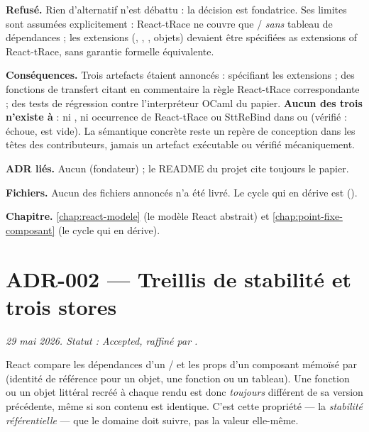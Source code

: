 \textbf{Refusé.} Rien d'alternatif n'est débattu : la décision est fondatrice.
Ses limites sont assumées explicitement : React-tRace ne couvre que
/ \emph{sans} tableau de dépendances ; les
extensions (, , , objets)
devaient être spécifiées \og as extensions of React-tRace\fg{}, sans garantie
formelle équivalente.

\textbf{Conséquences.} Trois artefacts étaient annoncés : 
spécifiant les extensions ; des fonctions de transfert citant en commentaire
la règle React-tRace correspondante ; des tests de régression contre
l'interpréteur OCaml du papier. \textbf{Aucun des trois n'existe à
\code{\snapshotCommit}} : ni , ni occurrence de
\og React-tRace\fg{} ou \og SttReBind\fg{} dans  ou 
(vérifié :  échoue,  est vide). La
sémantique concrète reste un repère de conception dans les têtes des
contributeurs, jamais un artefact exécutable ou vérifié mécaniquement.

\textbf{ADR liés.} Aucun (fondateur) ; le README du projet cite toujours le
papier.

\textbf{Fichiers.} Aucun des fichiers annoncés n'a été livré. Le cycle qui en
dérive est  ().

\textbf{Chapitre.} \cref{chap:react-modele} (le modèle React abstrait) et
\cref{chap:point-fixe-composant} (le cycle qui en dérive).

\section{ADR-002 --- Treillis de stabilité et trois stores}
\label{adr:2}
\noindent\textit{29 mai 2026. Statut : Accepted, raffiné par .}

\begin{react}
React compare les dépendances d'un / et les
props d'un composant mémoïsé par  (identité de référence pour
un objet, une fonction ou un tableau). Une fonction ou un objet littéral
recréé à chaque rendu est donc \emph{toujours} \og différent\fg{} de sa
version précédente, même si son contenu est identique. C'est cette propriété
— la \emph{stabilité référentielle} — que le domaine doit suivre, pas la
valeur elle-même.
\end{react}

